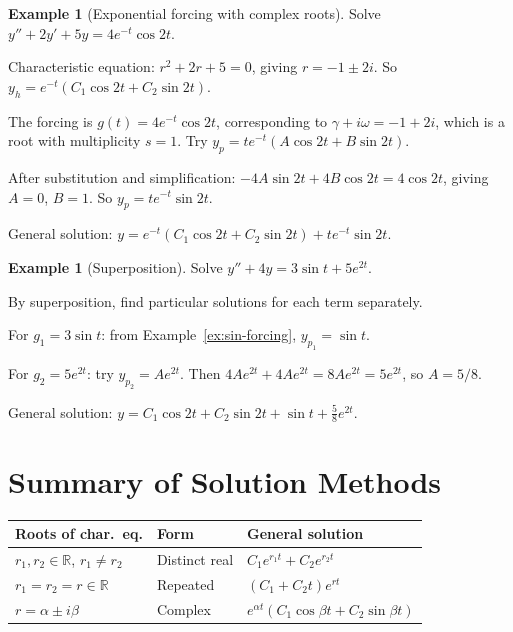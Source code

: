 \documentclass[12pt,a4paper,openany]{book}
\theoremstyle{definition}
\newtheorem{example}[definition]{Example}
\theoremstyle{plain}
\theoremstyle{remark}
\newcommand{\R}{\mathbb{R}}
\begin{document}
\begin{example}[Exponential forcing with complex roots]\label{ex:exp-complex}
Solve $y'' + 2y' + 5y = 4e^{-t}\cos 2t$.

Characteristic equation: $r^2 + 2r + 5 = 0$, giving $r = -1 \pm 2i$.
So $y_h = e^{-t}(C_1\cos 2t + C_2\sin 2t)$.

The forcing is $g(t) = 4e^{-t}\cos 2t$, corresponding to $\gamma + i\omega = -1+2i$,
which is a root with multiplicity $s = 1$. Try
$y_p = te^{-t}(A\cos 2t + B\sin 2t)$.

After substitution and simplification:
$-4A\sin 2t + 4B\cos 2t = 4\cos 2t$,
giving $A = 0$, $B = 1$. So $y_p = te^{-t}\sin 2t$.

General solution: $y = e^{-t}(C_1\cos 2t + C_2\sin 2t) + te^{-t}\sin 2t$.
\end{example}

\begin{example}[Superposition]\label{ex:superposition}
Solve $y'' + 4y = 3\sin t + 5e^{2t}$.

By superposition, find particular solutions for each term separately.

For $g_1 = 3\sin t$: from Example~\ref{ex:sin-forcing}, $y_{p_1} = \sin t$.

For $g_2 = 5e^{2t}$: try $y_{p_2} = Ae^{2t}$.
Then $4Ae^{2t} + 4Ae^{2t} = 8Ae^{2t} = 5e^{2t}$, so $A = 5/8$.

General solution: $y = C_1\cos 2t + C_2\sin 2t + \sin t + \frac{5}{8}e^{2t}$.
\end{example}

\section{Summary of Solution Methods}\label{sec:ch4-methods-table}

\begin{center}
\renewcommand{\arraystretch}{1.5}
\begin{tabular}{lll}
\toprule
\textbf{Roots of char.\ eq.} & \textbf{Form} & \textbf{General solution} \\
\midrule
$r_1, r_2 \in \R$, $r_1 \ne r_2$ & Distinct real &
  $C_1 e^{r_1 t} + C_2 e^{r_2 t}$ \\
$r_1 = r_2 = r \in \R$ & Repeated &
  $(C_1 + C_2 t)e^{rt}$ \\
$r = \alpha \pm i\beta$ & Complex &
  $e^{\alpha t}(C_1\cos\beta t + C_2\sin\beta t)$ \\
\bottomrule
\end{tabular}
\label{tab:homo-solutions}
\end{center}
\end{document}
